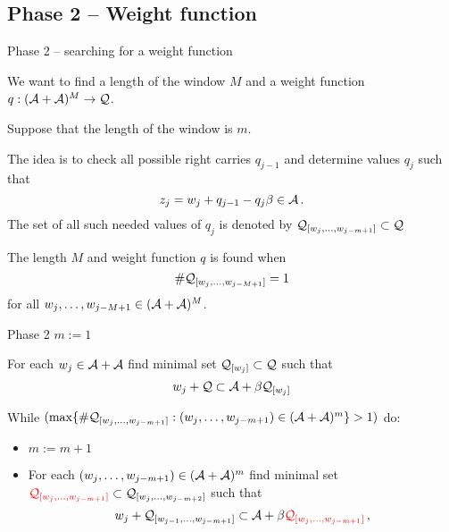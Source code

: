 \subsection{Phase 2 -- Weight function}

    {Phase 2 -- searching for a weight function}

    We want to find a length of the window $M$ and a weight function $q:(\mathcal{A}+\mathcal{A})^{M} \to \mathcal{Q}$.%
    
    
    Suppose that the length of the window is $m$.
    
    The idea is to check all possible right carries $q_{j-1}$ and determine values $q_j$ such that 
    $$
    z_j=w_j + q_{j-1} - q_j \beta \in \mathcal{A} \,.
    $$
    The set of all such needed values of $q_j$ is denoted by $\mathcal{Q}_{[w_{j},\dots, w_{j-m+1}]}\subset \mathcal{Q}$
        
    
    The length $M$ and weight function $q$ is found when 
    $$
    \#\mathcal{Q}_{[w_{j},\dots, w_{j-M+1}]}=1
    $$
    for all $w_{j},\dots, w_{j-M+1} \in (\mathcal{A}+\mathcal{A})^M$.
    



    {Phase 2}
      $m:=1$
      
      For each $w_j \in \mathcal{A}+\mathcal{A}$ find minimal set $\mathcal{Q}_{[w_j]} \subset \mathcal{Q}$ such that
      $$
      w_j + \mathcal{Q} \subset \mathcal{A} + \beta \mathcal{Q}_{[w_j]}
      $$
    
      While $(\max\{\#\mathcal{Q}_{[w_j,\dots, w_{j-m+1}]}:(w_j,\dots, w_{j-m+1}) \in (\mathcal{A}+\mathcal{A})^m \} > 1)$ do:
      \begin{itemize}
          
          \item $m:= m +1$
          
          \item For each $(w_j,\dots, w_{j-m+1}) \in (\mathcal{A}+\mathcal{A})^{m}$ find minimal set $\textcolor{red}{\mathcal{Q}_{[w_j,\dots, w_{j-m+1}]}} \subset \mathcal{Q}_{[w_j,\dots, w_{j-m+2}]}$ such that
          $$
          w_j + \mathcal{Q}_{[w_{j-1},\dots, w_{j-m+1}]} \subset \mathcal{A} + \beta \textcolor{red}{\mathcal{Q}_{[w_j,\dots, w_{j-m+1}]}}\,,
          $$
      \end{itemize}
      
